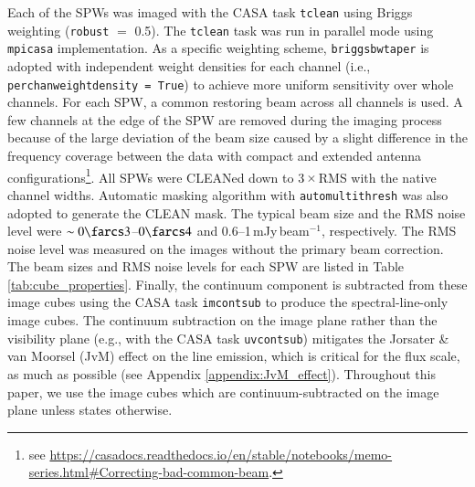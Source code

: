 \documentclass[linenumbers, twocolumn, twocolappendix, astrosymb, times]{aastex631}
\begin{document}
Each of the SPWs was imaged with the CASA task \texttt{tclean} \citep{Hogbom1974} using Briggs weighting (\texttt{robust} $=$ 0.5). The \texttt{tclean} task was run in parallel mode using \texttt{mpicasa} implementation. As a specific weighting scheme, \texttt{briggsbwtaper} is adopted with independent weight densities for each channel (i.e., \texttt{perchanweightdensity = True}) to achieve more uniform sensitivity over whole channels. For each SPW, a common restoring beam across all channels is used. A few channels at the edge of the SPW are removed during the imaging process because of the large deviation of the beam size caused by a slight difference in the frequency coverage between the data with compact and extended antenna configurations\footnote{see \url{https://casadocs.readthedocs.io/en/stable/notebooks/memo-series.html\#Correcting-bad-common-beam}.}. All SPWs were CLEANed down to 3\,$\times$\,RMS with the native channel widths. Automatic masking algorithm with \texttt{automultithresh} was also adopted to generate the CLEAN mask. The typical beam size and the RMS noise level were $\sim0\farcs3$--$0\farcs4$ and 0.6--1\,mJy\,beam$^{-1}$, respectively. The RMS noise level was measured on the images without the primary beam correction. The beam sizes and RMS noise levels for each SPW are listed in Table \ref{tab:cube_properties}. Finally, the continuum component is subtracted from these image cubes using the CASA task \texttt{imcontsub} to produce the spectral-line-only image cubes. The continuum subtraction on the image plane rather than the visibility plane (e.g., with the CASA task \texttt{uvcontsub}) mitigates the Jorsater \& van Moorsel (JvM) effect \citep{JvM, Czekala2021} on the line emission, which is critical for the flux scale, as much as possible (see Appendix \ref{appendix:JvM_effect}). Throughout this paper, we use the image cubes which are continuum-subtracted on the image plane unless states otherwise.
\end{document}
